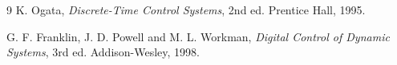 \documentclass[conference]{IEEEtran}
\begin{document}
\begin{thebibliography}{9}
K. Ogata, \emph{Discrete-Time Control Systems}, 2nd ed. Prentice Hall, 1995.

G. F. Franklin, J. D. Powell and M. L. Workman, \emph{Digital Control of Dynamic Systems}, 3rd ed. Addison-Wesley, 1998.
\end{thebibliography}

\end{document}
